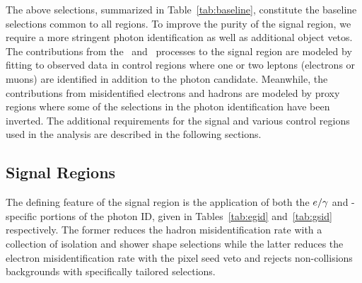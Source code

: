 The above selections, summarized in Table~\ref{tab:baseline}, constitute the baseline selections common to all regions.
To improve the purity of the signal region, we require a more stringent photon identification as well as additional object vetos.
The contributions from the \zinvg\ and \wlng\ processes to the signal region are modeled by fitting to observed data in control regions where one or two leptons (electrons or muons) are identified in addition to the photon candidate.
Meanwhile, the contributions from misidentified electrons and hadrons are modeled by proxy regions where some of the selections in the photon identification have been inverted. 
The additional requirements for the signal and various control regions used in the analysis are described in the following sections.

\begin{table}[htbp]
  \centering
  \caption{Baseline selections for all events considered in the analysis.}
  \label{tab:baseline}
\end{table}

\subsection{Signal Regions}
\label{sec:signal_regions}

The defining feature of the signal region is the application of both the ${e}/\gamma$ and \Pgg-specific portions of the photon ID, given in Tables~\ref{tab:egid} and~\ref{tab:gsid} respectively.
The former reduces the hadron misidentification rate with a collection of isolation and shower shape selections while the latter reduces the electron misidentification rate with the pixel seed veto and rejects non-collisions backgrounds with specifically tailored selections.

